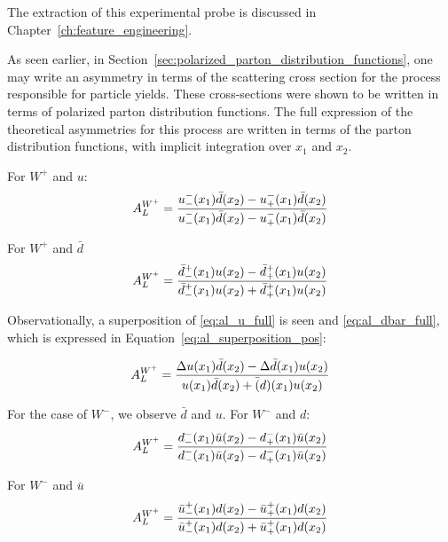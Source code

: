 {\noindent}The extraction of this experimental probe is discussed in
Chapter~\ref{ch:feature_engineering}.

As seen earlier, in Section~\ref{sec:polarized_parton_distribution_functions},
one may write an asymmetry in terms of the scattering cross section for the
process responsible for particle yields. These cross-sections were shown to be
written in terms of polarized parton distribution functions. The full expression
of the theoretical asymmetries for this process are written in terms of the
parton distribution functions, with implicit integration over $x_1$ and $x_2$.

For $W^+$ and $u$:
\begin{equation}
  {A_L^{W^+}} = 
  {
    {u_-^-(x_1)\bar{d}(x_2)-u_+^-(x_1)\bar{d}(x_2)}
    \over
    {u_-^-(x_1)\bar{d}(x_2)-u_+^-(x_1)\bar{d}(x_2)}
  }  
  \label{eq:al_u_full}
\end{equation}

For $W^+$ and $\bar{d}$
\begin{equation}
  {A_L^{W^+}} = 
  {
    {\bar{d}_-^+(x_1)u(x_2)-\bar{d}_+^+(x_1)u(x_2)}
    \over
    {\bar{d}_-^+(x_1)u(x_2)+\bar{d}_+^+(x_1)u(x_2)}
  }  
  \label{eq:al_dbar_full}
\end{equation}

{\noindent}Observationally, a superposition of \ref{eq:al_u_full} is seen and
\ref{eq:al_dbar_full}, which is expressed in
Equation~\ref{eq:al_superposition_pos}:

\begin{equation}
  {A_L^{W^+}} = 
  {
    {
      \Delta u(x_1)\bar{d}(x_2)-\Delta \bar{d}(x_1)u(x_2)
    }
    \over
    {
      u(x_1)\bar d(x_2)+\bar(d)(x_1)u(x_2)
    }
  }
  \label{eq:al_superposition_pos}
\end{equation}

{\noindent}For the case of $W^-$, we observe $\bar{d}$ and $u$. For $W^-$ and $d$:
\begin{equation}
  {A_L^{W^+}} = 
  {
    {d_-^-(x_1)\bar{u}(x_2)-d_+^-(x_1)\bar{u}(x_2)}
    \over
    {d_-^-(x_1)\bar{u}(x_2)-d_+^-(x_1)\bar{u}(x_2)}
  }  
  \label{eq:al_d_full}
\end{equation}

{\noindent}For $W^-$ and $\bar{u}$
\begin{equation}
  {A_L^{W^+}} = 
  {
    {\bar{u}_-^+(x_1)d(x_2)-\bar{u}_+^+(x_1)d(x_2)}
    \over
    {\bar{u}_-^+(x_1)d(x_2)+\bar{u}_+^+(x_1)d(x_2)}
  }  
  \label{eq:al_ubar_full}
\end{equation}

